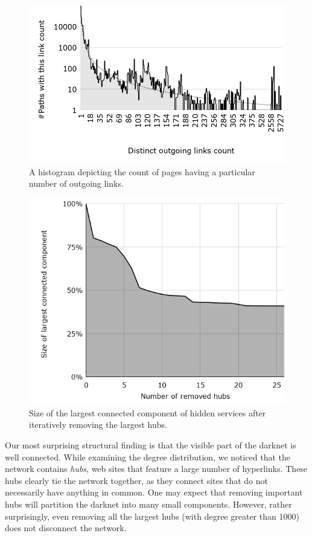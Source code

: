 \ifdgruyter
  \begin{figure}[H]
      \centering
      \includegraphics[width=\linewidth]{images/DistinctOutgoingLinksCount.png}
      \caption{A histogram depicting the count of pages having a particular
               number of outgoing links.}
      \label{fig:outgoingPowerLaw}
  \end{figure}
\fi

\iflncs
  \begin{figure}
   \vspace{-15pt}
    \centering
    \includegraphics[trim={4.5cm 0 3cm 1cm}, width=0.65\linewidth]{images/LinkhubsRemoval.png}
    \caption{Size of the largest connected component of hidden services after iteratively removing the largest hubs.}
    \label{fig:largestConnectedComponent}
  \end{figure}
\fi
Our most surprising structural finding is that the visible part of the darknet is well connected. 
While examining the degree distribution, we noticed that the network contains \emph{hubs}, web sites that feature a large number of hyperlinks.  These hubs clearly tie the network together, as they connect sites that do not necessarily have anything in common.
One may expect that removing important hubs will partition the darknet into many small components. However, rather surprisingly, even removing all the largest hubs (with degree greater than 1000) does not disconnect the network.

